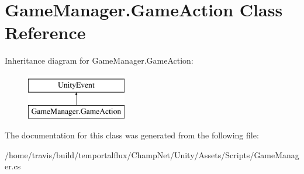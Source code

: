\hypertarget{class_game_manager_1_1_game_action}{\section{Game\-Manager.\-Game\-Action Class Reference}
\label{class_game_manager_1_1_game_action}
}
Inheritance diagram for Game\-Manager.\-Game\-Action\-:\begin{figure}[H]
\begin{center}
\leavevmode
\includegraphics[height=2.000000cm]{class_game_manager_1_1_game_action}
\end{center}
\end{figure}


The documentation for this class was generated from the following file\-:\begin{DoxyCompactItemize}
\item 
/home/travis/build/temportalflux/\-Champ\-Net/\-Unity/\-Assets/\-Scripts/Game\-Manager.\-cs\end{DoxyCompactItemize}

